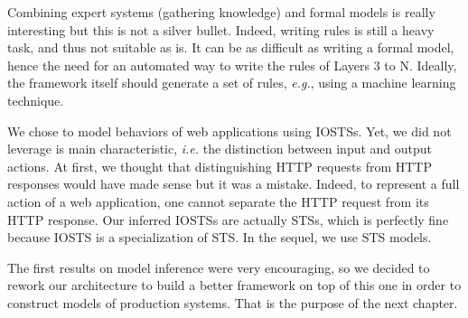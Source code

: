 Combining expert systems (gathering knowledge) and formal models
is really interesting but this is not a silver bullet. Indeed,
writing rules is still a heavy task, and thus not suitable as
is. It can be as difficult as writing a formal model, hence the
need for an automated way to write the rules of Layers 3 to N.
Ideally, the framework itself should generate a set of rules,
\emph{e.g.}, using a machine learning technique.

We chose to model behaviors of web applications using
IOSTSs. Yet, we did not
leverage is main characteristic, \emph{i.e.} the distinction
between input and output actions. At first, we thought that
distinguishing HTTP requests from HTTP responses would have made
sense but it was a mistake. Indeed, to represent a full action of
a web application, one cannot separate the HTTP request from its
HTTP response. Our inferred IOSTSs are actually STSs, which is
perfectly fine because IOSTS is a specialization of STS. In the
sequel, we use STS models.

The first results on model inference were very encouraging, so we
decided to rework our architecture to build a better framework on
top of this one in order to construct models of production
systems. That is the purpose of the next chapter.
